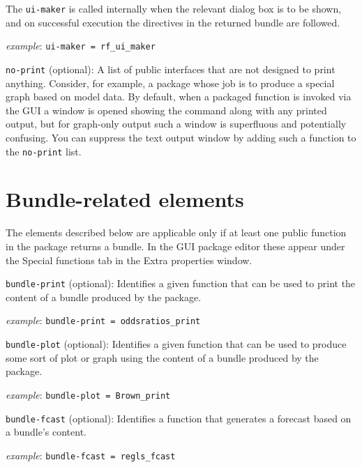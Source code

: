 \documentclass[oneside]{book}
\newcommand{\ttusage}[1]{\textit{example}: \quad \texttt{#1}}
\newcommand{\vbusage}[0]{\textit{example}: \quad}
\begin{document}
\begin{description}
  The \texttt{ui-maker} is called internally when the relevant dialog
  box is to be shown, and on successful execution the directives in
  the returned bundle are followed.

\ttusage{ui-maker = rf\_ui\_maker}

\item \texttt{no-print} (optional): A list of public interfaces that
  are not designed to print anything.  Consider, for example, a
  package whose job is to produce a special graph based on model data.
  By default, when a packaged function is invoked via the GUI a window
  is opened showing the command along with any printed output, but for
  graph-only output such a window is superfluous and potentially
  confusing. You can suppress the text output window by adding such a
  function to the \texttt{no-print} list.

\end{description}

\section{Bundle-related elements}
\label{sec:spec-bundle}

The elements described below are applicable only if at least one
public function in the package returns a bundle. In the GUI package
editor these appear under the \textsf{Special functions} tab in the
\textsf{Extra properties} window.

\begin{description}

\item \texttt{bundle-print} (optional): Identifies a given function that can
  be used to print the content of a bundle produced by the package.

  \vbusage{} \verb|bundle-print = oddsratios_print|

\item \texttt{bundle-plot} (optional): Identifies a given function that can
  be used to produce some sort of plot or graph using the content of a
  bundle produced by the package.

  \vbusage{} \verb|bundle-plot = Brown_print|

\item \texttt{bundle-fcast} (optional): Identifies a function that
  generates a forecast based on a bundle's content.

  \vbusage{} \verb|bundle-fcast = regls_fcast|

\end{description}
\end{document}
